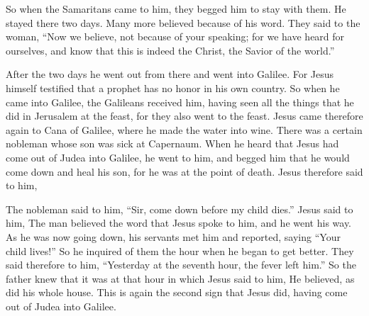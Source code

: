 {So when the Samaritans came to him, they begged him to stay with them. He stayed there two days.
Many more believed because of his word.
They said to the woman, “Now we believe, not because of your speaking; for we have heard for ourselves, and know that this is indeed the Christ, the Savior of the world.”
\par }{\PP {}After the two days he went out from there and went into Galilee.
For Jesus himself testified that a prophet has no honor in his own country.
So when he came into Galilee, the Galileans received him, having seen all the things that he did in Jerusalem at the feast, for they also went to the feast.
Jesus came therefore again to Cana of Galilee, where he made the water into wine. There was a certain nobleman whose son was sick at Capernaum.
When he heard that Jesus had come out of Judea into Galilee, he went to him, and begged him that he would come down and heal his son, for he was at the point of death.
Jesus therefore said to him,
{}
\par }{\PP {}The nobleman said to him, “Sir, come down before my child dies.”
Jesus said to him,
{} The man believed the word that Jesus spoke to him, and he went his way.
As he was now going down, his servants met him and reported, saying “Your child lives!”
So he inquired of them the hour when he began to get better. They said therefore to him, “Yesterday at the seventh hour, the fever left him.”
So the father knew that it was at that hour in which Jesus said to him,
{} He believed, as did his whole house.
This is again the second sign that Jesus did, having come out of Judea into Galilee.

}
